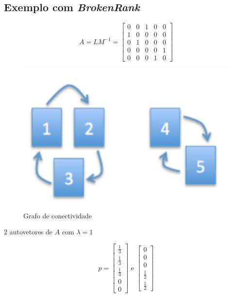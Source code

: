 \documentclass[
  letterpaper,
  DIV=11,
  numbers=noendperiod]{scrartcl}
\begin{document}
\hypertarget{exemplo-com-brokenrank}{%
\subsection{\texorpdfstring{Exemplo com
\emph{BrokenRank}}{Exemplo com BrokenRank}}\label{exemplo-com-brokenrank}}

\[ A = LM^{-1} = \begin{bmatrix}0&0&1&0&0\\1&0&0&0&0\\0&1&0&0&0\\0&0&0&0&1\\0&0&0&1&0\end{bmatrix}\]

\begin{figure}

{\centering \includegraphics{figs/Aula09/exemplo_BR.png}

}

\caption{Grafo de conectividade}

\end{figure}

2 autovetores de \(A\) com \(\lambda=1\)

\[p = \begin{bmatrix}\frac{1}{3}\\\frac{1}{3}\\\frac{1}{3}\\0\\0\end{bmatrix} \text{ e } \begin{bmatrix}0\\0\\0\\\frac{1}{2}\\\frac{1}{2}\end{bmatrix}\]
\end{document}
